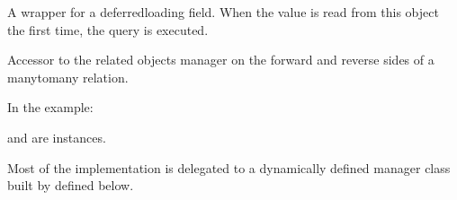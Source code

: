 \documentclass[letterpaper,10pt,english]{sphinxmanual}
\begin{document}
\begin{fulllineitems}
\begin{fulllineitems}
\label{\detokenize{users:users.models.assignments.id}}
\sphinxAtStartPar
A wrapper for a deferred\sphinxhyphen{}loading field. When the value is read from this
object the first time, the query is executed.

\end{fulllineitems}


\begin{fulllineitems}
\label{\detokenize{users:users.models.assignments.objects}}
\end{fulllineitems}


\begin{fulllineitems}
\label{\detokenize{users:users.models.assignments.s}}
\sphinxAtStartPar
Accessor to the related objects manager on the forward and reverse sides of
a many\sphinxhyphen{}to\sphinxhyphen{}many relation.

\sphinxAtStartPar
In the example:

\begin{sphinxVerbatim}[commandchars=\\\{\}]
 
       
\end{sphinxVerbatim}

\sphinxAtStartPar
{} and  are 
instances.

\sphinxAtStartPar
Most of the implementation is delegated to a dynamically defined manager
class built by  defined below.

\end{fulllineitems}


\end{fulllineitems}
\end{document}
